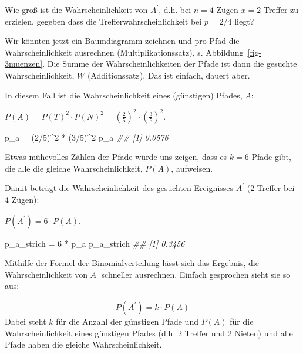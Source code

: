 \documentclass[
  a4paper,
  DIV=11]{scrreprt}
\newenvironment{Shaded}{\begin{snugshade}}{\end{snugshade}}
\newcommand{\DecValTok}[1]{\textcolor[rgb]{0.68,0.00,0.00}{#1}}
\newcommand{\DocumentationTok}[1]{\textcolor[rgb]{0.37,0.37,0.37}{\textit{#1}}}
\newcommand{\NormalTok}[1]{\textcolor[rgb]{0.00,0.23,0.31}{#1}}
\newcommand{\OtherTok}[1]{\textcolor[rgb]{0.00,0.23,0.31}{#1}}
\newcommand{\SpecialCharTok}[1]{\textcolor[rgb]{0.37,0.37,0.37}{#1}}
\theoremstyle{definition}
\theoremstyle{remark}
\begin{document}
Wie groß ist die Wahrscheinlichkeit von \(A^{\prime}\), d.h. bei \(n=4\)
Zügen \(x=2\) Treffer zu erzielen, gegeben dass die
Trefferwahrscheinlichkeit bei \(p=2/4\) liegt?

Wir könnten jetzt ein Baumdiagramm zeichnen und pro Pfad die
Wahrscheinlichkeit ausrechnen (Multiplikationssatz), s.
Abbildung~\ref{fig-3muenzen}. Die Summe der Wahrscheinlichkeiten der
Pfade ist dann die gesuchte Wahrscheinlichkeit, \(W\) (Additionssatz).
Das ist einfach, dauert aber.

In diesem Fall ist die Wahrscheinlichkeit eines (günstigen) Pfades,
\(A\):

\(P(A) = P(T)^2 \cdot P(N)^2 = \left( \frac{2}{5} \right)^2 \cdot \left( \frac{3}{5} \right) ^2\).

\begin{Shaded}
\begin{Highlighting}[]
\NormalTok{p\_a }\OtherTok{=}\NormalTok{ (}\DecValTok{2}\SpecialCharTok{/}\DecValTok{5}\NormalTok{)}\SpecialCharTok{\^{}}\DecValTok{2} \SpecialCharTok{*}\NormalTok{ (}\DecValTok{3}\SpecialCharTok{/}\DecValTok{5}\NormalTok{)}\SpecialCharTok{\^{}}\DecValTok{2}
\NormalTok{p\_a}
\DocumentationTok{\#\# [1] 0.0576}
\end{Highlighting}
\end{Shaded}

Etwas mühevolles Zählen der Pfade würde uns zeigen, dass es \(k=6\)
Pfade gibt, die alle die gleiche Wahrscheinlichkeit, \(P(A)\),
aufweisen.

Damit beträgt die Wahrscheinlichkeit des gesuchten Ereignisses
\(A^{\prime}\) (2 Treffer bei 4 Zügen):

\(P(A^{\prime}) = 6 \cdot P(A)\).

\begin{Shaded}
\begin{Highlighting}[]
\NormalTok{p\_a\_strich }\OtherTok{=} \DecValTok{6} \SpecialCharTok{*}\NormalTok{ p\_a}
\NormalTok{p\_a\_strich}
\DocumentationTok{\#\# [1] 0.3456}
\end{Highlighting}
\end{Shaded}

Mithilfe der Formel der Binomialverteilung lässt sich das Ergebnis, die
Wahrscheinlichkeit von \(A^{\prime}\) schneller ausrechnen. Einfach
gesprochen sieht sie so aus:

\[P(A^{\prime}) = k \cdot P(A)\] Dabei steht \(k\) für die Anzahl der
günstigen Pfade und \(P(A)\) für die Wahrscheinlichkeit eines günstigen
Pfades (d.h. 2 Treffer und 2 Nieten) und alle Pfade haben die gleiche
Wahrscheinlichkeit.
\end{document}
